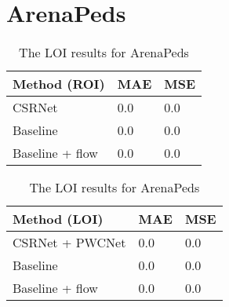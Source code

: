 \section{ArenaPeds}
\begin{table}[!htb]
    \begin{minipage}{.5\linewidth}
      \centering
		\begin{tabular}{lll}
		\hline
		Method (ROI)                               & MAE & MSE \\ \hline
		\multicolumn{1}{l|}{CSRNet}          & 0.0 & 0.0 \\
		\multicolumn{1}{l|}{Baseline}        & 0.0 & 0.0 \\
		\multicolumn{1}{l|}{Baseline + flow} & 0.0 & 0.0 \\ \hline
		\end{tabular}
		\caption{\label{tab:roi_fudan}The ROI results for ArenaPeds}
	\end{minipage}
	\begin{minipage}{.5\linewidth}
      \centering
		\begin{tabular}{lll}
		\hline
		Method (LOI)                               & MAE & MSE \\ \hline
		\multicolumn{1}{l|}{CSRNet + PWCNet}          & 0.0 & 0.0 \\
		\multicolumn{1}{l|}{Baseline}        & 0.0 & 0.0 \\
		\multicolumn{1}{l|}{Baseline + flow} & 0.0 & 0.0 \\ \hline
		\end{tabular}
		\caption{\label{tab:loi_fudan}The LOI results for ArenaPeds}
	\end{minipage}
\end{table}


